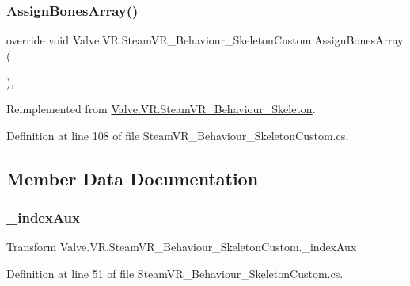 \subsubsection{\texorpdfstring{AssignBonesArray()}{AssignBonesArray()}}
{\footnotesize\ttfamily override void Valve.\+V\+R.\+Steam\+V\+R\+\_\+\+Behaviour\+\_\+\+Skeleton\+Custom.\+Assign\+Bones\+Array (\begin{DoxyParamCaption}{ }\end{DoxyParamCaption})\hspace{0.3cm}{\ttfamily [protected]}, {\ttfamily [virtual]}}



Reimplemented from \mbox{\hyperlink{class_valve_1_1_v_r_1_1_steam_v_r___behaviour___skeleton_a1d94d724c0240744213baf0b550af9c0}{Valve.\+V\+R.\+Steam\+V\+R\+\_\+\+Behaviour\+\_\+\+Skeleton}}.



Definition at line 108 of file Steam\+V\+R\+\_\+\+Behaviour\+\_\+\+Skeleton\+Custom.\+cs.



\subsection{Member Data Documentation}
\mbox{\label{class_valve_1_1_v_r_1_1_steam_v_r___behaviour___skeleton_custom_aee2f6cc17f5a90a539d744d434a25177}} 
\subsubsection{\texorpdfstring{\_indexAux}{\_indexAux}}
{\footnotesize\ttfamily Transform Valve.\+V\+R.\+Steam\+V\+R\+\_\+\+Behaviour\+\_\+\+Skeleton\+Custom.\+\_\+index\+Aux\hspace{0.3cm}{\ttfamily [protected]}}



Definition at line 51 of file Steam\+V\+R\+\_\+\+Behaviour\+\_\+\+Skeleton\+Custom.\+cs.

\mbox{\label{class_valve_1_1_v_r_1_1_steam_v_r___behaviour___skeleton_custom_a0ad73fd49c6caa95c5c8a772032c8be3}} 
